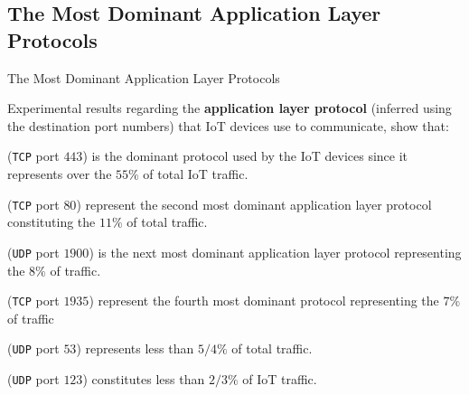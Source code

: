 \documentclass[13.5pt]{beamer}
\begin{document}
\subsection{The Most Dominant Application Layer Protocols}
\begin{frame}{The Most Dominant Application Layer Protocols}

Experimental results regarding the \textbf{application layer protocol} (inferred using the destination port numbers) that IoT devices use to communicate, show that:

\begin{description}
\justifying

\item[\texttt{HTTPS}] (\texttt{TCP} port $443$) is the dominant protocol used by the IoT devices since it represents over the $55\%$ of total IoT traffic.

\item[\texttt{HTTP}] (\texttt{TCP} port $80$) represent the second most dominant application layer protocol constituting the $11\%$ of total traffic.

\item[\texttt{SSDP}] (\texttt{UDP} port $1900$) is the next most dominant application layer protocol representing the $8\%$ of traffic.

\item[\texttt{RTMP}] (\texttt{TCP} port $1935$) represent the fourth most dominant protocol representing the $7\%$ of traffic

\item[\texttt{DNS}] (\texttt{UDP} port $53$) represents less than $5/4\%$ of total traffic.

\item[\texttt{NTP}] (\texttt{UDP} port $123$) constitutes less than $2/3\%$ of IoT traffic.

\end{description}

\end{frame} 
\end{document}
